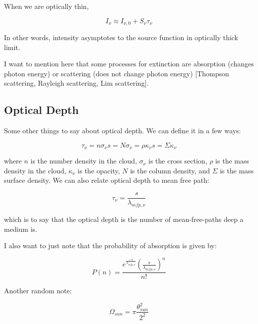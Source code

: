 \documentclass{article}
\begin{document}
When we are optically thin,

\begin{equation}
    I_\nu \approx I_{\nu,0} + S_\nu \tau_\nu
\end{equation}

In other words, intensity asymptotes to the source function in optically thick limit. 

I want to mention here that some processes for extinction are absorption (changes photon energy) or scattering (does not change photon energy) [Thompson scattering, Rayleigh scattering, Lim scattering].\\

\subsection{Optical Depth}

Some other things to say about optical depth. We can define it in a few ways:

\begin{equation}
    \tau_\nu = n \sigma_\nu s = N \sigma_\nu = \rho \kappa_\nu s = \Sigma \kappa_\nu
\end{equation}

where $n$ is the number density in the cloud, $\sigma_\nu$ is the cross section, $\rho$ is the mass density in the cloud, $\kappa_\nu$ is the opacity, $N$ is the column density, and $\Sigma$ is the mass surface density. We can also relate optical depth to mean free path:

\begin{equation}
    \tau_\nu = \frac{s}{\lambda_{mfp, \nu}}
\end{equation}

which is to say that the optical depth is the number of mean-free-paths deep a medium is. 

I also want to just note that the probability of absorption is given by:

\begin{equation}
    P(n) = \frac{e^{\frac{-s}{\lambda_{mfp, \nu}}} \left(\frac{s}{\lambda_{mfp, \nu}}\right)^n}{n!}
\end{equation}

Another random note:

\begin{equation}
    \Omega_{sun} = \pi \frac{\theta_{sun}^2}{2^2}
\end{equation}

\newpage
\end{document}
